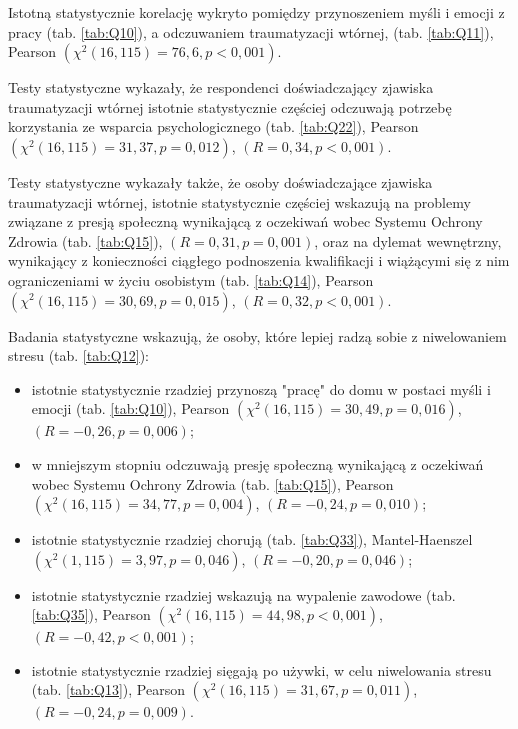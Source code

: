 \documentclass[a4paper,12pt,twoside,openright]{mwrep}
\begin{document}
Istotną statystycznie korelację wykryto pomiędzy przynoszeniem myśli i emocji z pracy  (tab. \ref{tab:Q10}), a odczuwaniem traumatyzacji wtórnej, (tab. \ref{tab:Q11}), Pearson $(\chi^2 (16, 115) = 76,6, p < 0,001)$.
  
Testy statystyczne wykazały, że respondenci doświadczający zjawiska traumatyzacji wtórnej  istotnie statystycznie częściej odczuwają potrzebę korzystania ze wsparcia psychologicznego  (tab. \ref{tab:Q22}), Pearson $(\chi^2 (16, 115) = 31,37, p = 0,012)$,  $(R = 0,34, p < 0,001)$.

Testy statystyczne wykazały także, że osoby doświadczające zjawiska traumatyzacji wtórnej,  istotnie statystycznie częściej wskazują na problemy związane z presją społeczną wynikającą z oczekiwań wobec Systemu Ochrony Zdrowia (tab. \ref{tab:Q15}), $(R = 0,31, p = 0,001)$, oraz na dylemat wewnętrzny, wynikający z konieczności ciągłego podnoszenia kwalifikacji i wiążącymi się z nim ograniczeniami w życiu osobistym (tab. \ref{tab:Q14}), Pearson $(\chi^2 (16, 115) = 30,69, p = 0,015)$,  $(R = 0,32, p < 0,001)$.



Badania statystyczne wskazują, że osoby, które lepiej radzą sobie z niwelowaniem stresu  (tab. \ref{tab:Q12}):
	\begin{itemize}
		\item istotnie statystycznie  rzadziej przynoszą "pracę" do domu w postaci myśli i emocji (tab. \ref{tab:Q10}), Pearson $(\chi^2 (16, 115) = 30,49, p = 0,016)$,  $(R = -0,26, p = 0,006)$;
		\item w mniejszym stopniu odczuwają presję społeczną wynikającą z oczekiwań wobec Systemu Ochrony Zdrowia (tab. \ref{tab:Q15}),  Pearson $(\chi^2 (16, 115) = 34,77, p = 0,004)$, $(R = -0,24, p = 0,010)$;
		\item  istotnie statystycznie rzadziej chorują  (tab. \ref{tab:Q33}), Mantel-Haenszel $(\chi^2 (1, 115) = 3,97, p = 0,046)$, $(R = -0,20, p = 0,046)$;
		\item  istotnie statystycznie rzadziej wskazują na wypalenie zawodowe  (tab. \ref{tab:Q35}), Pearson $(\chi^2 (16, 115) = 44,98, p < 0,001)$, $(R = -0,42, p < 0,001)$;
		\item istotnie statystycznie  rzadziej sięgają po używki, w celu niwelowania stresu  (tab. \ref{tab:Q13}), Pearson $(\chi^2 (16, 115) = 31,67, p = 0,011)$, $(R = -0,24, p = 0,009)$.
	\end{itemize}
	
\end{document}
